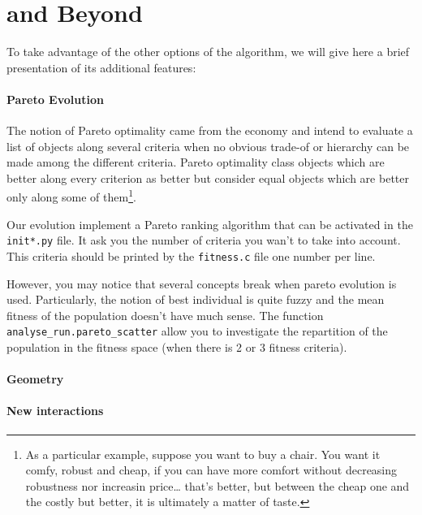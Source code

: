 \documentclass[]{article}
\begin{document}
\section{and Beyond}\label{and-beyond}

To take advantage of the other options of the algorithm, we will give
here a brief presentation of its additional features:

\paragraph{Pareto Evolution}\label{pareto-evolution}

The notion of Pareto optimality came from the economy and intend to
evaluate a list of objects along several criteria when no obvious
trade-of or hierarchy can be made among the different criteria. Pareto
optimality class objects which are better along every criterion as
better but consider equal objects which are better only along some of
them\footnote{As a particular example, suppose you want to buy a chair.
You want it comfy, robust and cheap, if you can have more comfort
without decreasing robustness nor increasin price… that's better,
but between the cheap one and the costly but better, it is ultimately
a matter of taste.}.

Our evolution implement a Pareto ranking algorithm that can be activated
in the \verb#init*.py# file. It ask you the number of criteria you wan't to
take into account. This criteria should be printed by the \verb#fitness.c# file
one number per line.

However, you may notice that several concepts break when pareto
evolution is used. Particularly, the notion of best individual is quite
fuzzy and the mean fitness of the population doesn't have much sense.
The function \verb#analyse_run.pareto_scatter# allow you to investigate
the repartition of the population in the fitness space (when there is 2
or 3 fitness criteria).

\paragraph{Geometry}\label{geometry}

\paragraph{New interactions}\label{new-interactions}
\end{document}
